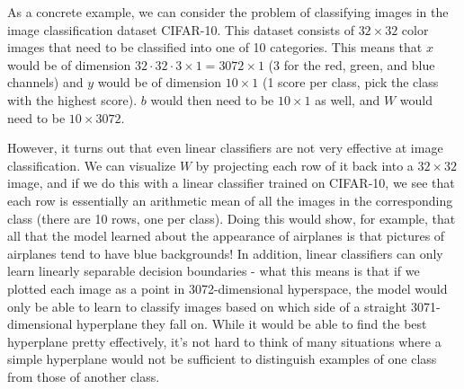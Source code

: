As a concrete example, we can consider the problem of classifying images in the image classification dataset CIFAR-10. This dataset consists of $32 \times 32$ color images that need to be classified into one of 10 categories. This means that $x$ would be of dimension $32 \cdot 32 \cdot 3 \times 1 = 3072 \times 1$ (3 for the red, green, and blue channels) and $y$ would be of dimension $10 \times 1$ (1 score per class, pick the class with the highest score). $b$ would then need to be $10 \times 1$ as well, and $W$ would need to be $10 \times 3072$. 

However, it turns out that even linear classifiers are not very effective at image classification. We can visualize $W$ by projecting each row of it back into a $32 \times 32$ image, and if we do this with a linear classifier trained on CIFAR-10, we see that each row is essentially an arithmetic mean of all the images in the corresponding class (there are 10 rows, one per class). Doing this would show, for example, that all that the model learned about the appearance of airplanes is that pictures of airplanes tend to have blue backgrounds! In addition, linear classifiers can only learn linearly separable decision boundaries - what this means is that if we plotted each image as a point in 3072-dimensional hyperspace, the model would only be able to learn to classify images based on which side of a straight 3071-dimensional hyperplane they fall on. While it would be able to find the best hyperplane pretty effectively, it's not hard to think of many situations where a simple hyperplane would not be sufficient to distinguish examples of one class from those of another class.
